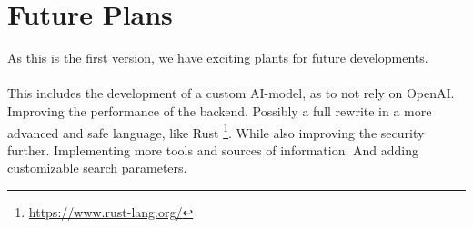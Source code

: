 \documentclass[
    a4paper,
    pagesize,
	pdftex,
    12pt,
]{scrartcl}
\begin{document}
\section{Future Plans}
As this is the first version, we have exciting plants for future developments.
\\ \\
This includes the development of a custom AI-model, as to not rely on OpenAI. 
Improving the performance of the backend. Possibly a full rewrite in a more advanced and safe language, like Rust \footnote{\url{https://www.rust-lang.org/}}. 
While also improving the security further. 
Implementing more tools and sources of information. 
And adding customizable search parameters.

\newpage



\end{document}
